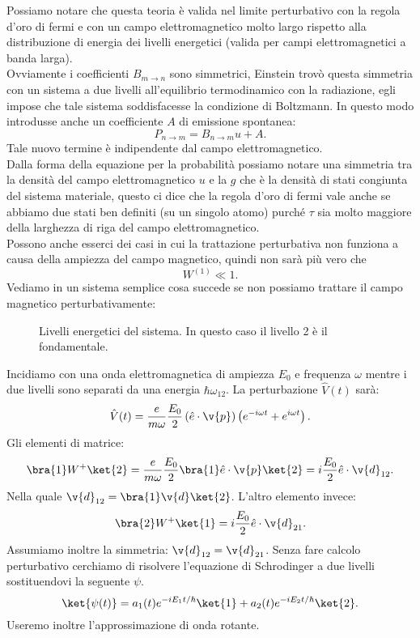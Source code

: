Possiamo notare che questa teoria è valida nel limite perturbativo con la regola d'oro di fermi e con un campo elettromagnetico molto largo rispetto alla distribuzione di energia dei livelli energetici (valida per campi elettromagnetici a banda larga).\\
Ovviamente i coefficienti $B_{m\to n}$ sono simmetrici, Einstein trovò questa simmetria con un sistema a due livelli all'equilibrio termodinamico con la radiazione, egli impose che tale sistema soddisfacesse la condizione di Boltzmann. In questo modo introdusse anche un coefficiente $A$ di emissione spontanea:
\[
P_{n\to m} = B_{n\to m} u + A
.\] 
Tale nuovo termine è indipendente dal campo elettromagnetico.\\
Dalla forma della equazione per la probabilità possiamo notare una simmetria tra la densità del campo elettromagnetico $u$ e la $g$ che è la densità di stati congiunta del sistema materiale, questo ci dice che la regola d'oro di fermi vale anche se abbiamo due stati ben definiti (su un singolo atomo) purché $\tau$ sia molto maggiore della larghezza di riga del campo elettromagnetico.\\
Possono anche esserci dei casi in cui la trattazione perturbativa non funziona a causa della ampiezza del campo magnetico, quindi non sarà più vero che
\[
    W^{(1)}\ll 1
.\] 
Vediamo in un sistema semplice cosa succede se non possiamo trattare il campo magnetico perturbativamente:
\begin{figure}[ht]
    \centering
    \caption{Livelli energetici del sistema. In questo caso il livello 2 è il fondamentale.}
    \label{fig:livelliarimondo}
\end{figure}
Incidiamo con una onda elettromagnetica di ampiezza $E_0$ e frequenza $\omega$ mentre i due livelli sono separati da una energia $\hbar \omega_{12}$. La perturbazione $\hat{V}(t) $ sarà:
\[
    \hat{V}(t) = \frac{e}{m\omega} \frac{E_0}{2}\left(\hat{e}\cdot \v{p}\right)
    \left(e^{-i\omega t}+e^{i\omega t}\right)
.\] 
Gli elementi di matrice:
\[
\bra{1}W^+ \ket{2}= \frac{e}{m\omega}\frac{E_0}{2}\bra{1}\hat{e}\cdot \v{p}\ket{2}=
i \frac{E_0}{2}\hat{e}\cdot \v{d}_{12} 
.\] 
Nella quale $\v{d}_{12} = \bra{1}\v{d} \ket{2}$. L'altro elemento invece:
\[
\bra{2}W^+ \ket{1}=
i \frac{E_0}{2}\hat{e}\cdot \v{d}_{21} 
.\] 
Assumiamo inoltre la simmetria: $\v{d}_{12}=\v{d}_{21}$. Senza fare calcolo perturbativo cerchiamo di risolvere l'equazione di Schrodinger a due livelli sostituendovi la seguente $\psi$.
\[
    \ket{\psi(t) }=
    a_1(t) e^{-iE_1t /\hbar }\ket{1}+a_2(t) e^{-i E_2t /\hbar }\ket{2}
.\] 
Useremo inoltre l'approssimazione di onda rotante.
